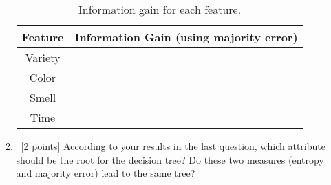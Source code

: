 \begin{enumerate}
\begin{enumerate}
    \begin{table}[h!]
      \centering
      \begin{tabular}{c|c}
        \hline
        Feature & Information Gain (using majority error) \\ \hline
        Variety &                  \\
        Color   &                  \\
        Smell   &                  \\
        Time    &                  \\ \hline
      \end{tabular}
      \caption{Information gain for each feature.}\label{tb-maj-ig}
    \end{table}

  \item~[2 points] According to your results in the last question, which
    attribute should be the root for the decision tree?  Do these two measures
    (entropy and majority error) lead to the same tree?
  \end{enumerate}

\end{enumerate}



